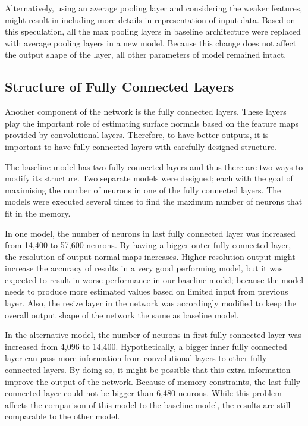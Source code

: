 Alternatively, using an average pooling layer and considering the weaker features, might result in including more details in representation of input data. Based on this speculation, all the max pooling layers in baseline architecture were replaced with average pooling layers in a new model. Because this change does not affect the output shape of the layer, all other parameters of model remained intact.   

\subsection{Structure of Fully Connected Layers}

Another component of the network is the fully connected layers. These layers play the important role of estimating surface normals based on the feature maps provided by convolutional layers. Therefore, to have better outputs, it is important to have fully connected layers with carefully designed structure. 

The baseline model has two fully connected layers and thus there are two ways to modify its structure. Two separate models were designed; each with the goal of maximising the number of neurons in one of the fully connected layers. The models were executed several times to find the maximum number of neurons that fit in the memory. 

In one model, the number of neurons in last fully connected layer was increased from 14,400 to 57,600 neurons. By having a bigger outer fully connected layer, the resolution of output normal maps increases. Higher resolution output might increase the accuracy of results in a very good performing model, but it was expected to result in worse performance in our baseline model; because the model needs to produce more estimated values based on limited input from previous layer. Also, the resize layer in the network was accordingly modified to keep the overall output shape of the network the same as baseline model. 

In the alternative model, the number of neurons in first fully connected layer was increased from 4,096 to 14,400. Hypothetically, a bigger inner fully connected layer can pass more information from convolutional layers to other fully connected layers. By doing so, it might be possible that this extra information improve the output of the network. Because of memory constraints, the last fully connected layer could not be bigger than 6,480 neurons. While this problem affects the comparison of this model to the baseline model, the results are still comparable to the other model.

